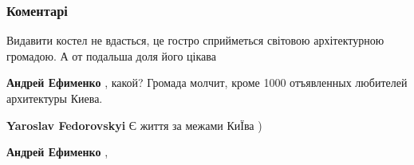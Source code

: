  
 
 
 
 
\subsubsection{Коментарі}
\label{sec:04_08_2021.fb.shirochin_semen.1.kostel_pozhar.cmt}

\begin{itemize}
 
Видавити костел не вдасться, це гостро сприйметься світовою архітектурною громадою.
А от подальша доля його цікава

\begin{itemize}
 
\textbf{Андрей Ефименко} , какой? Громада молчит, кроме 1000 отъявленных любителей архитектуры Киева.

 
\textbf{Yaroslav Fedorovskyi}
Є життя за межами КиЇва )

 
\textbf{Андрей Ефименко} ,👏
\end{itemize}

 

\end{itemize}
